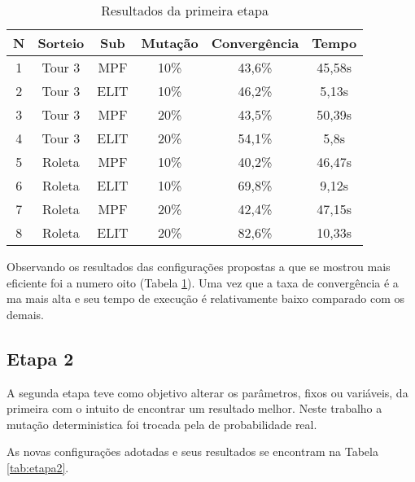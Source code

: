 \documentclass[a4paper, 12pt]{article}
\begin{document}
    \begin{table}[h]
      \centering
      \begin{tabular}{|c|c|c|c|c|c|}
        \hline
        N & Sorteio & Sub & Mutação & Convergência & Tempo \\
        \hline
        1 & Tour 3 & MPF & 10\% & 43,6\% & 45,58s \\
        \hline
        2 & Tour 3 & ELIT & 10\% & 46,2\% & 5,13s \\
        \hline
        3 & Tour 3 & MPF & 20\% & 43,5\% & 50,39s \\
        \hline
        4 & Tour 3 & ELIT & 20\% & 54,1\% & 5,8s \\
        \hline
        5 & Roleta & MPF & 10\% & 40,2\% & 46,47s \\
        \hline
        6 & Roleta & ELIT & 10\% & 69,8\% & 9,12s \\
        \hline
        7 & Roleta & MPF & 20\% & 42,4\% & 47,15s \\
        \hline
        8 & Roleta & ELIT & 20\% & 82,6\% & 10,33s \\
        \hline
      \end{tabular}
      \caption{Resultados da primeira etapa}
      \label{tab:etapa1}
    \end{table}

  Observando os resultados das configurações propostas a que se mostrou mais
  eficiente foi a numero oito (Tabela \ref{tab:etapa1}). Uma vez que a taxa de convergência é a
  ma mais alta e seu tempo de execução é relativamente baixo comparado com os demais.

  \subsection{Etapa 2}
  A segunda etapa teve como objetivo alterar os parâmetros, fixos ou variáveis,
  da primeira com o intuito de encontrar um resultado melhor. Neste trabalho
  a mutação deterministica foi trocada pela de probabilidade real.

  As novas configurações adotadas e seus resultados se encontram na Tabela \ref{tab:etapa2}.
\end{document}
